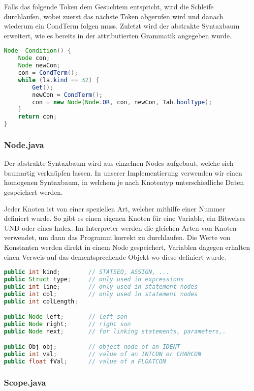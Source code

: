 Falls das folgende Token dem Gesuchtem entspricht, wird die Schleife durchlaufen, wobei zuerst das n\"achste Token abgerufen wird und danach wiederum ein CondTerm folgen muss. Zuletzt wird der abstrakte Syntaxbaum erweitert, wie es bereits in der attributierten Grammatik angegeben wurde.

\begin{lstlisting}[language=Java]
Node  Condition() {
	Node con;
	Node newCon; 
	con = CondTerm();
	while (la.kind == 32) {
		Get();
		newCon = CondTerm();
		con = new Node(Node.OR, con, newCon, Tab.boolType); 
	}
	return con;
}
\end{lstlisting}

\subsubsection{Node.java}

Der abstrakte Syntaxbaum wird aus einzelnen Nodes aufgebaut, welche sich baumartig verkn\"upfen lassen. In unserer Implementierung verwenden wir einen homogenen Syntaxbaum, in welchem je nach Knotentyp unterschiedliche Daten gespeichert werden.

Jeder Knoten ist von einer speziellen Art, welcher mithilfe einer Nummer definiert wurde. So gibt es einen eigenen Knoten f\"ur eine Variable, ein Bitweises UND oder eines Index. Im Interpreter werden die gleichen Arten von Knoten verwendet, um dann das Programm korrekt zu durchlaufen. Die Werte von Konstanten werden direkt in einem Node gespeichert, Variablen dagegen erhalten einen Verweis auf das dementsprechende Objekt wo diese definiert wurde.

\begin{lstlisting}[language=Java]
public int kind;        // STATSEQ, ASSIGN, ...
public Struct type;     // only used in expressions
public int line;        // only used in statement nodes
public int col;         // only used in statement nodes
public int colLength;

public Node left;       // left son
public Node right;      // right son
public Node next;       // for linking statements, parameters,.

public Obj obj;         // object node of an IDENT
public int val;         // value of an INTCON or CHARCON
public float fVal;      // value of a FLOATCON
\end{lstlisting}

\subsubsection{Scope.java}

